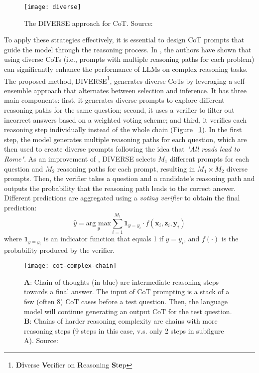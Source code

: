 \begin{figure}[h!]
	\centering
	\texttt{[image: diverse]}
	\caption{The DIVERSE approach for CoT. Source: \textcite{li2022making}}
	\label{fig:diverse}
\end{figure}

To apply these strategies effectively, it is essential to design CoT prompts that guide the model through the reasoning process.
In \textcite{li2022making}, the authors have shown that using diverse CoTs (i.e., prompts with multiple reasoning paths for each problem) can significantly enhance the performance of LLMs on complex reasoning tasks.
The proposed method, DIVERSE\footnote{\textbf{Di}verse \textbf{Ve}rifier on \textbf{R}easoning \textbf{S}t\textbf{e}p}, generates diverse CoTs by leveraging a self-ensemble approach that alternates between selection and inference.
It has three main components: first, it generates diverse prompts to explore different reasoning paths for the same question; second, it uses a verifier to filter out incorrect answers based on a weighted voting scheme; and third, it verifies each reasoning step individually instead of the whole chain (Figure ~\ref{fig:diverse}).
In the first step, the model generates multiple reasoning paths for each question, which are then used to create diverse prompts following the idea that \textit{"All roads lead to Rome"}.
As an improvement of \textcite{wang2022self}, DIVERSE selects $M_1$ different prompts for each question and $M_2$ reasoning paths for each prompt, resulting in $M_1 \times M_2$ diverse prompts.
Then, the verifier takes a question and a candidate's reasoning path and outputs the probability that the reasoning path leads to the correct answer.
Different predictions are aggregated using a \textit{voting verifier} to obtain the final prediction:
\begin{equation}
	\hat{y} = \underset{y}{\text{arg max}} \sum_{i=1}^{M_1} \textbf{1}_{y = y_{i}} \cdot f(\textbf{x}_i, \textbf{z}_i, \textbf{y}_i)
	\label{eq:diverse}
\end{equation}
where $\textbf{1}_{y = y_{i}}$ is an indicator function that equals 1 if $y = y_{i}$, and $f(\cdot)$ is the probability produced by the verifier.

\begin{figure}[h!]
	\centering
	\texttt{[image: cot-complex-chain]}
	\caption{\textbf{A}: Chain of thoughts (in blue) are intermediate reasoning steps towards a final answer. The input of CoT prompting is a stack of a few (often 8) CoT cases before a test question. Then, the language model will continue generating an output CoT for the test question. \textbf{B}: Chains of harder reasoning complexity are chains with more reasoning steps (9 steps in this case, v.s. only 2 steps in subfigure A). Source: \textcite{fu2022complexity}}
	\label{fig:cot-complex-chain}
\end{figure}

